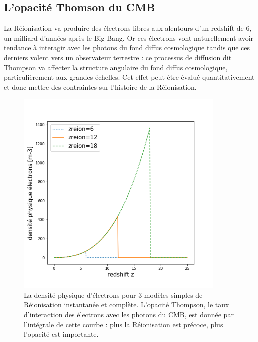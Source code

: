 \subsection{L'opacité Thomson du CMB}
La Réionisation va produire des électrons libres aux alentours d'un redshift de 6, un milliard d'années après le Big-Bang. Or ces électrons vont naturellement avoir tendance à interagir avec les photons du fond diffus cosmologique tandis que ces derniers volent vers un observateur terrestre : ce processus de diffusion dit Thompson va affecter la structure angulaire du fond diffus cosmologique, particulièrement aux grandes échelles. Cet effet peut-être évalué quantitativement et donc mettre des contraintes sur l'histoire de la Réionisation.

\begin{figure}[htbp]
	\centering
		\includegraphics[height=10cm]{figs/ne.png}
		\caption[La densité d'électrons cosmique]{La densité physique d'électrons pour 3 modèles simples de Réionisation instantanée et complète. L'opacité Thompson, le taux d'interaction des électrons avec les photons du CMB, est donnée par l'intégrale de cette courbe : plus la Réionisation est précoce, plus l'opacité est importante.}
	\label{f:nereion}
\end{figure}

